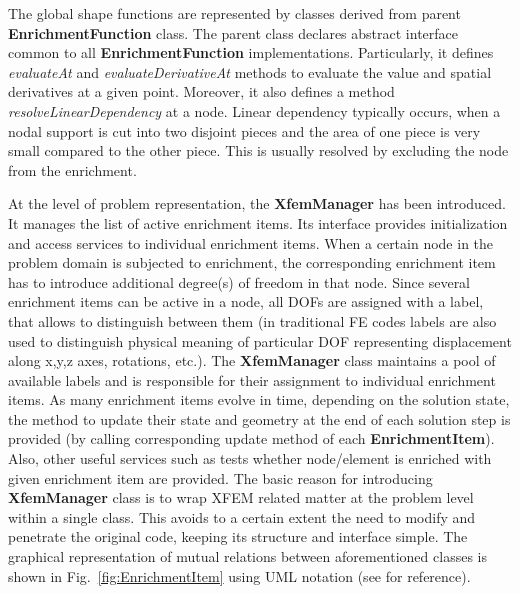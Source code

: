 \documentclass[a4paper]{article}
\newcommand{\class}[1]{{\bf #1}}
\newcommand{\service}[1]{{\em #1}}
\begin{document}
The global shape functions are represented by classes derived from parent \class{EnrichmentFunction} class. The parent class declares abstract interface common to all \class{EnrichmentFunction} implementations. Particularly, it defines \service{evaluateAt} and \service{evaluateDerivativeAt} methods to evaluate the value and spatial derivatives at a given point. Moreover, it also defines a method \service{resolveLinearDependency} at a node. Linear dependency typically occurs, when a nodal support is cut into two disjoint pieces and the area of one piece is very small compared to the other piece\cite{MoDoBe99}. This is usually resolved by excluding the node from the enrichment.


At the level of problem representation, the \class{XfemManager} has been introduced. It manages the list of active enrichment items. Its interface provides initialization and access services to individual enrichment items. When a certain node in the problem domain is subjected to enrichment, the corresponding enrichment item has to introduce additional degree(s) of freedom in that node. Since several enrichment items can be active in a node, all DOFs are assigned with a label, that allows to distinguish between them (in traditional FE codes labels are also used to distinguish physical meaning of particular DOF representing displacement along x,y,z axes, rotations, etc.). The \class{XfemManager} class maintains a pool of available labels and is responsible for their assignment to individual enrichment items. As many enrichment items evolve in time, depending on the solution state, the method to update their state and geometry at the end of each solution step is provided (by calling corresponding update method of each \class{EnrichmentItem}). Also, other useful services such as tests whether node/element is enriched with given enrichment item are provided. The basic reason for introducing \class{XfemManager} class is to wrap XFEM related matter at the problem level within a single class. This avoids to a certain extent the need to modify and penetrate the original code, keeping its structure and interface simple. The graphical representation of mutual relations between aforementioned classes is shown in Fig.~\ref{fig:EnrichmentItem} using UML notation (see \cite{uml} for reference).
 
\end{document}
